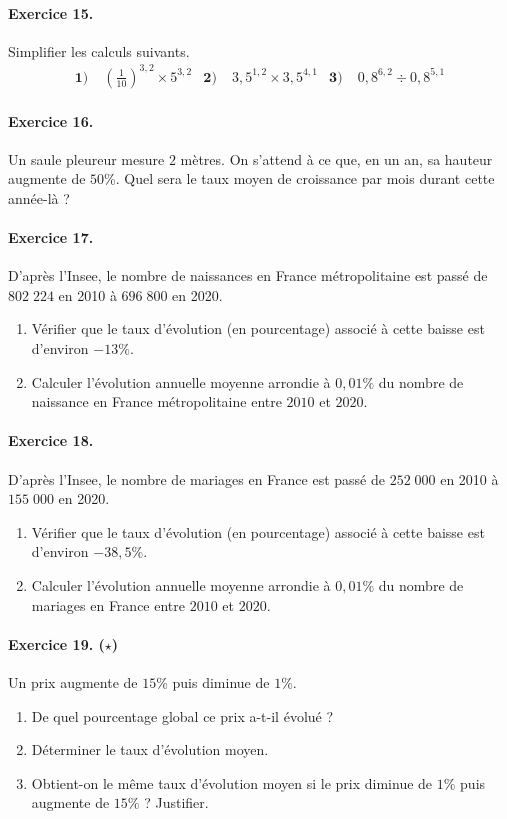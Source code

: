 \documentclass[11pt]{article}
\begin{document}
\paragraph{Exercice 15.} Simplifier les calculs suivants.
\begin{align*}
  \textbf{1)}\;& \left( \frac{1}{10} \right)^{3,2}\times5^{3,2} & 
  \textbf{2)}\;& 3,5^{1,2}\times3,5^{4,1} &
  \textbf{3)}\;& 0,8^{6,2}\div0,8^{5,1}
\end{align*}



\paragraph{Exercice 16.} Un saule pleureur mesure $2$ mètres. On s'attend à ce
que, en un an, sa hauteur augmente de $50$\%.
Quel sera le taux moyen de croissance par mois durant cette année-là ?

\paragraph{Exercice 17.} D'après l'Insee, le nombre de naissances en France
métropolitaine est passé de $802\;224$ en 2010 à $696\;800$ en 2020.
\begin{enumerate}
  \item Vérifier que le taux d'évolution (en pourcentage) associé à cette baisse
    est d'environ $-13\%$.
  \item Calculer l'évolution annuelle moyenne arrondie à $0,01\%$ du nombre de
    naissance en France métropolitaine entre $2010$ et $2020$.
\end{enumerate}

\paragraph{Exercice 18.} D'après l'Insee, le nombre de mariages en France
est passé de $252\;000$ en 2010 à $155\;000$ en 2020.
\begin{enumerate}
  \item Vérifier que le taux d'évolution (en pourcentage) associé à cette baisse
    est d'environ $-38,5\%$.
  \item Calculer l'évolution annuelle moyenne arrondie à $0,01\%$ du nombre de
    mariages en France entre $2010$ et $2020$.
\end{enumerate}

\paragraph{Exercice 19. ($\star$)} Un prix augmente de $15\%$ puis diminue de $1\%$.
\begin{enumerate}
  \item De quel pourcentage global ce prix a-t-il évolué ?
  \item Déterminer le taux d'évolution moyen.
  \item Obtient-on le même taux d'évolution moyen si le prix diminue de $1\%$
    puis augmente de $15\%$ ? Justifier.
\end{enumerate}
\end{document}
